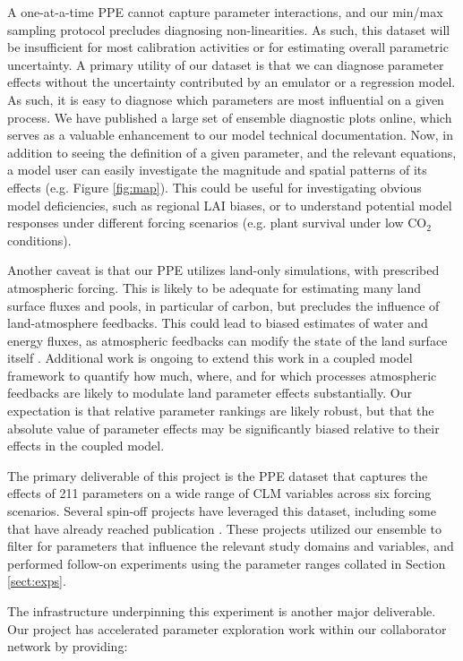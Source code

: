 \documentclass[draft]{agujournal2019}
\begin{document}
A one-at-a-time PPE cannot capture parameter interactions, and our min/max sampling protocol precludes diagnosing non-linearities. As such, this dataset will be insufficient for most calibration activities or for estimating overall parametric uncertainty. A primary utility of our dataset is that we can diagnose parameter effects without the uncertainty contributed by an emulator or a regression model. As such, it is easy to diagnose which parameters are most influential on a given process. We have published a large set of ensemble diagnostic plots online, which serves as a valuable enhancement to our model technical documentation. Now, in addition to seeing the definition of a given parameter, and the relevant equations, a model user can easily investigate the magnitude and spatial patterns of its effects (e.g. Figure \ref{fig:map}). This could be useful for investigating obvious model deficiencies, such as regional LAI biases, or to understand potential model responses under different forcing scenarios (e.g. plant survival under low CO$_2$ conditions).  

Another caveat is that our PPE utilizes land-only simulations, with prescribed atmospheric forcing. This is likely to be adequate for estimating many land surface fluxes and pools, in particular of carbon, but precludes the influence of land-atmosphere feedbacks. This could lead to biased estimates of water and energy fluxes, as atmospheric feedbacks can modify the state of the land surface itself \cite{lague2019}. Additional work is ongoing to extend this work in a coupled model framework to quantify how much, where, and for which processes atmospheric feedbacks are likely to modulate land parameter effects substantially. Our expectation is that relative parameter rankings are likely robust, but that the absolute value of parameter effects may be significantly biased relative to their effects in the coupled model.

The primary deliverable of this project is the PPE dataset that captures the effects of 211 parameters on a wide range of CLM variables across six forcing scenarios. Several spin-off projects have leveraged this dataset, including some that have already reached publication \cite{cheng2023,yan2023a,yan2023b}. These projects utilized our ensemble to filter for parameters that influence the relevant study domains and variables, and performed follow-on experiments using the parameter ranges collated in Section \ref{sect:exps}. 

The infrastructure underpinning this experiment is another major deliverable. Our project has accelerated parameter exploration work within our collaborator network by providing:
\end{document}
